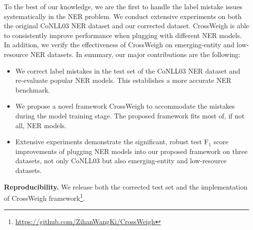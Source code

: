 \documentclass[11pt,a4paper]{article}
\newcommand{\our}{\mbox{\sf CrossWeigh}\xspace}
\newcommand{\smallsection}[1]{{\noindent\textbf{#1.}}}
\begin{document}
To the best of our knowledge, we are the first to handle
the label mistake issues systematically in the NER problem. 
We conduct extensive experiments on both the original CoNLL03 NER dataset and our corrected dataset. 
\our is able to consistently improve performance when plugging with different NER models.
In addition, we verify the effectiveness of \our on emerging-entity and low-resource NER datasets.
In summary, our major contributions are the following:
\begin{itemize}[leftmargin=*,nosep]
    \item We correct label mistakes in the test set of the CoNLL03 NER dataset and re-evaluate popular NER models.
    This establishes a more accurate NER benchmark.
    \item We propose a novel framework \our to accommodate the mistakes during the model training stage. 
    The proposed framework fits most of, if not all, NER models.
    \item Extensive experiments demonstrate the significant, robust test F$_1$ score improvements of plugging NER models into our proposed framework on three datasets, not only CoNLL03 but also emerging-entity and low-resource datasets.
\end{itemize}

\smallsection{Reproducibility}
We release both the corrected test set and the implementation of \our framework\footnote{\url{https://github.com/ZihanWangKi/CrossWeigh}}.

 \begin{table*}[t]
\centering
\vspace{-0.3cm}
\small
{}
\vspace{-0.15cm}
\caption{Typical Examples of Our Corrections on the CoNLL03 NER dataset.}
\label{tbl:annotation_mistake}
\vspace{-0.4cm}
\end{table*}
 
\end{document}
